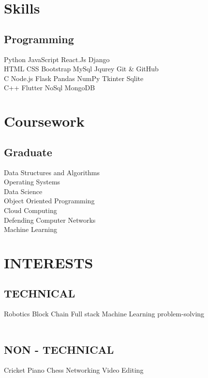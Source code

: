 \documentclass[]{deedy-resume-openfont}
\begin{document}
\begin{minipage}[t]{0.33\textwidth}

\section{Skills}
\subsection{Programming}
Python \textbullet{} JavaScript \textbullet{} React.Js  \textbullet{} Django  \\ \textbullet{} HTML  \textbullet{} CSS \textbullet{} Bootstrap \textbullet{} MySql \textbullet{} Jqurey \textbullet{} Git \& GitHub \\
C \textbullet{} Node.js  \textbullet{} Flask \textbullet{} Pandas  \textbullet{} NumPy \textbullet{} Tkinter \textbullet{} Sqlite \\
C++ \textbullet{} Flutter  \textbullet{} NoSql \textbullet{} MongoDB
\sectionsep



\section{Coursework}
\subsection{Graduate}

Data Structures and Algorithms \\
Operating Systems \\
Data Science \\
Object Oriented Programming\\
Cloud Computing \\
Defending Computer Networks \\
Machine Learning \\
\sectionsep

\section{INTERESTS}
\subsection{TECHNICAL}
Robotics \textbullet{}  Block Chain \textbullet{} Full stack
Machine Learning \textbullet{} problem-solving  \\\
\subsection{NON - TECHNICAL}
Cricket\textbullet{}  Piano \textbullet{} Chess \textbullet{} Networking \textbullet{} Video Editing  \\

\sectionsep

%
%

\end{minipage} 
\end{document}
